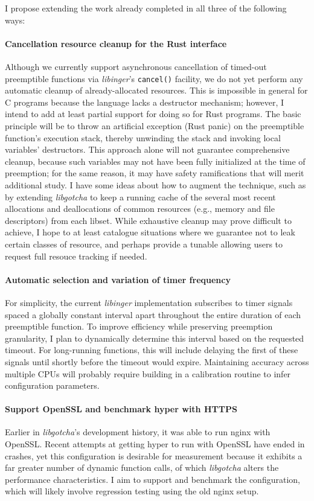 \documentclass[12pt,letterpaper,openright]{report}
\begin{document}
I propose extending the work already completed in all three of the following ways:

\paragraph{Cancellation resource cleanup for the Rust interface}
Although we currently support asynchronous cancellation of timed-out preemptible
functions via \textit{libinger}'s \texttt{cancel()} facility, we do not yet perform
any automatic cleanup of already-allocated resources.  This is impossible
in general for C programs because the language lacks a destructor mechanism; however,
I intend to add at least partial support for doing so for Rust programs.  The basic
principle will be to throw an artificial exception (Rust panic) on the preemptible
function's execution stack, thereby unwinding the stack and invoking local variables'
destructors.  This approach alone will not guarantee comprehensive cleanup, because
such variables may not have been fully initialized at the time of preemption; for the
same reason, it may have safety ramifications that will merit additional study.  I
have some ideas about how to augment the technique, such as by extending
\textit{libgotcha} to keep a running cache of the several most recent allocations and
deallocations of common resources (e.g., memory and file descriptors) from each
libset.  While exhaustive cleanup may prove difficult to achieve, I hope to at least
catalogue situations where we guarantee not to leak certain classes of resource, and
perhaps provide a tunable allowing users to request full resouce tracking if needed.

\paragraph{Automatic selection and variation of timer frequency}
For simplicity, the current \textit{libinger} implementation subscribes to timer
signals spaced a globally constant interval apart throughout the entire duration of
each preemptible function.  To improve efficiency while preserving preemption
granularity, I plan to dynamically determine this interval based on the requested
timeout.  For long-running functions, this will include delaying the first of these
signals until shortly before the timeout would expire.  Maintaining accuracy across
multiple CPUs will probably require building in a calibration routine to infer
configuration parameters.

\paragraph{Support OpenSSL and benchmark hyper with HTTPS}
Earlier in \textit{libgotcha}'s development history, it was able to run nginx with
OpenSSL.  Recent attempts at getting hyper to run with OpenSSL have ended in crashes,
yet this configuration is desirable for measurement because it exhibits a far greater
number of dynamic function calls, of which \textit{libgotcha} alters the performance
characteristics.  I aim to support and benchmark the configuration, which will likely
involve regression testing using the old nginx setup.
\end{document}

